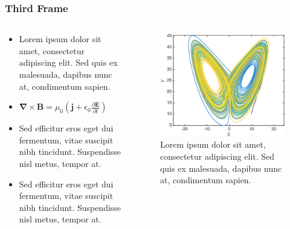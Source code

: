 \documentclass{beamer}
\newcommand{\vect}[1]{\ensuremath{\mathbf{#1}}}
\newcommand{\del}{\ensuremath{\mathbf{\nabla}}}
\newcommand{\partder}[2]{\ensuremath{\frac{\partial #1}{\partial #2}}}
\begin{document}
\begin{frame}
\frametitle{Third Frame}
\begin{columns}
\begin{column}{.5\linewidth}

\begin{itemize}
\item Lorem ipsum dolor sit amet, consectetur adipiscing elit. Sed quis ex malesuada, dapibus nunc at, condimentum sapien. 
\item $\del \times \vect{B} = \mu_0 \left( \vect{j} + \epsilon_0 \partder{\vect{E}}{t} \right)$
\item  Sed efficitur eros eget dui fermentum, vitae suscipit nibh tincidunt. Suspendisse nisl metus, tempor at.
\item  Sed efficitur eros eget dui fermentum, vitae suscipit nibh tincidunt. Suspendisse nisl metus, tempor at.
\end{itemize}

\end{column}

\begin{column}{.5\linewidth}

\begin{figure}
\includegraphics[width=\textwidth]{butterfly.eps}
\caption{Lorem ipsum dolor sit amet, consectetur adipiscing elit. Sed quis ex malesuada, dapibus nunc at, condimentum sapien. }
\end{figure}

\end{column}
\end{columns}

\end{frame}
\end{document}
